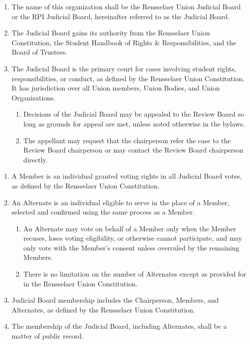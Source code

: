 

\begin{enumerate}
\item 	The name of this organization shall be the Rensselaer Union Judicial Board or the RPI Judicial Board, hereinafter referred to as the Judicial Board. 
\item The Judicial Board gains its authority from the Rensselaer Union Constitution, the Student Handbook of Rights \& Responsibilities, and the Board of Trustees. 
\item  The Judicial Board is the primary court for cases involving student rights, responsibilities, or conduct, as defined by the Rensselaer Union Constitution. It has jurisdiction over all Union members, Union Bodies, and Union Organizations.
\begin{enumerate}
    \item Decisions of the Judicial Board may be appealed to the Review Board so long as grounds for appeal are met, unless noted otherwise in the bylaws.
    \item The appellant may request that the chairperson refer the case to the Review Board chairperson or may contact the Review Board chairperson directly.
\end{enumerate}
\end{enumerate}


\begin{enumerate}
\item A Member is an individual granted voting rights in all Judicial Board votes, as defined by the Rensselaer Union Constitution. 
\item An Alternate is an individual eligible to serve in the place of a Member, selected and confirmed using the same process as a Member.
\begin{enumerate}
    \item An Alternate may vote on behalf of a Member only when the Member recuses, loses voting eligibility, or otherwise cannot participate, and may only vote with the Member’s consent unless overruled by the remaining Members. 
    \item There is no limitation on the number of Alternates except as provided for in the Rensselaer Union Constitution. 
\end{enumerate}
\item Judicial Board membership includes the Chairperson, Members, and Alternates, as defined by the Rensselaer Union Constitution.
\item The membership of the Judicial Board, including Alternates, shall be a matter of public record. 
\end{enumerate}


